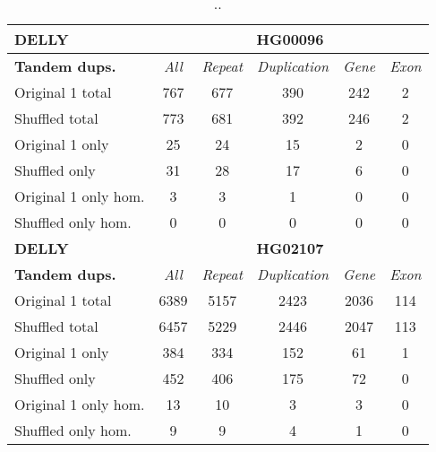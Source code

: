 \begin{table}[htb]
\caption{ .. }
\begin{center}
\begin{tabular}{|l|c||c|c|c|c|}
\hline
{\bf DELLY} & \multicolumn{5}{|c|}{\bf HG00096} \\
\hline
\cline{2-6}
{\bf Tandem dups.} & {\it All} & {\it Repeat} & {\it Duplication} & {\it Gene} & {\it Exon} \\
\hline
Original 1 total & 767 & 677 & 390 & 242 & 2\\ 
\hline
Shuffled total & 773 & 681 & 392 & 246 & 2\\ 
\hline
Original 1 only & 25 & 24 & 15 & 2 & 0\\ 
\hline
Shuffled only & 31 & 28 & 17 & 6 & 0\\ 
\hline
Original 1 only hom. & 3 & 3 & 1 & 0 & 0\\ 
\hline
Shuffled only hom. & 0 & 0 & 0 & 0 & 0\\ 
\hline
\hline
{\bf DELLY} & \multicolumn{5}{|c|}{\bf HG02107} \\
\hline
\cline{2-6}
{\bf Tandem dups.} & {\it All} & {\it Repeat} & {\it Duplication} & {\it Gene} & {\it Exon} \\
\hline
Original 1 total & 6389 & 5157 & 2423 & 2036 & 114\\ 
\hline
Shuffled total & 6457 & 5229 & 2446 & 2047 & 113\\ 
\hline
Original 1 only & 384 & 334 & 152 & 61 & 1\\ 
\hline
Shuffled only & 452 & 406 & 175 & 72 & 0\\ 
\hline
Original 1 only hom. & 13 & 10 & 3 & 3 & 0\\ 
\hline
Shuffled only hom. & 9 & 9 & 4 & 1 & 0\\ 
\hline
\end{tabular}
\end{center}
\label{tab:orig-vs-shuf-delly-dups}
\end{table}

